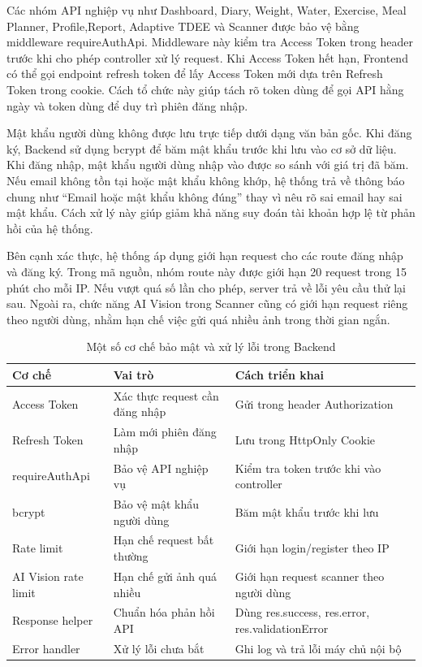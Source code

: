 \documentclass[12pt, a4paper]{report}
\begin{document}
Các nhóm API nghiệp vụ như Dashboard, Diary, Weight, Water, Exercise, Meal Planner, Profile,Report, Adaptive TDEE và Scanner được bảo vệ bằng middleware requireAuthApi. Middleware này kiểm tra Access Token trong header trước khi cho phép controller xử lý request. Khi Access Token hết hạn, Frontend có thể gọi endpoint refresh token để lấy Access Token mới dựa trên Refresh Token trong cookie. Cách tổ chức này giúp tách rõ token dùng để gọi API hằng ngày và token dùng để duy trì phiên đăng nhập.

Mật khẩu người dùng không được lưu trực tiếp dưới dạng văn bản gốc. Khi đăng ký, Backend sử dụng bcrypt để băm mật khẩu trước khi lưu vào cơ sở dữ liệu. Khi đăng nhập, mật khẩu người dùng nhập vào được so sánh với giá trị đã băm. Nếu email không tồn tại hoặc mật khẩu không khớp, hệ thống trả về thông báo chung như “Email hoặc mật khẩu không đúng” thay vì nêu rõ sai email hay sai mật khẩu. Cách xử lý này giúp giảm khả năng suy đoán tài khoản hợp lệ từ phản hồi của hệ thống.

Bên cạnh xác thực, hệ thống áp dụng giới hạn request cho các route đăng nhập và đăng ký. Trong mã nguồn, nhóm route này được giới hạn 20 request trong 15 phút cho mỗi IP. Nếu vượt quá số lần cho phép, server trả về lỗi yêu cầu thử lại sau. Ngoài ra, chức năng AI Vision trong Scanner cũng có giới hạn request riêng theo người dùng, nhằm hạn chế việc gửi quá nhiều ảnh trong thời gian ngắn.

\begin{table}[htbp]
\centering
\caption{Một số cơ chế bảo mật và xử lý lỗi trong Backend}
\begin{tabular}{|p{4cm}|p{4cm}|p{7cm}|}
\hline
\textbf{Cơ chế} & \textbf{Vai trò} & \textbf{Cách triển khai} \\
\hline
Access Token & Xác thực request cần đăng nhập & Gửi trong header Authorization \\
\hline
Refresh Token & Làm mới phiên đăng nhập & Lưu trong HttpOnly Cookie \\
\hline
requireAuthApi & Bảo vệ API nghiệp vụ & Kiểm tra token trước khi vào controller \\
\hline
bcrypt & Bảo vệ mật khẩu người dùng & Băm mật khẩu trước khi lưu \\
\hline
Rate limit & Hạn chế request bất thường & Giới hạn login/register theo IP \\
\hline
AI Vision rate limit & Hạn chế gửi ảnh quá nhiều & Giới hạn request scanner theo người dùng \\
\hline
Response helper & Chuẩn hóa phản hồi API & Dùng res.success, res.error, res.validationError \\
\hline
Error handler & Xử lý lỗi chưa bắt & Ghi log và trả lỗi máy chủ nội bộ \\
\hline
\hline
\end{tabular}
\end{table}
\end{document}
